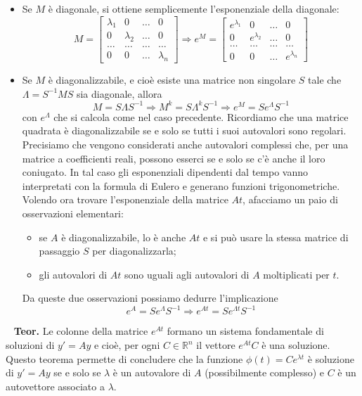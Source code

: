 \begin{itemize}
    \item Se $M$ è diagonale, si ottiene semplicemente l'esponenziale della diagonale:
    \[
        M = \left[\begin{matrix}
            \lambda_1 & 0 & \dots & 0\\
            0 & \lambda_2 & \dots & 0\\
            \dots & \dots & \dots & \dots \\
            0 & 0 & \dots & \lambda_n
        \end{matrix}\right] \Longrightarrow e^{M} = \left[\begin{matrix}
            e^{\lambda_1} & 0 & \dots & 0\\
            0 & e^{\lambda_2} & \dots & 0\\
            \dots & \dots & \dots & \dots \\
            0 & 0 & \dots & e^{\lambda_n}
        \end{matrix}\right]
    \]
    \item Se $M$ è diagonalizzabile, e cioè esiste una matrice non singolare $S$ tale che $\Lambda = S^{-1} M S$ sia diagonale, allora
    \[
        M = S \Lambda S^{-1} \Longrightarrow M^k = S \Lambda^k S^{-1} \Longrightarrow e^{M} = S e^{\Lambda}S^{-1}
    \]
    con $e^{\Lambda}$ che si calcola come nel caso precedente.\newline
    \newline
    Ricordiamo che una matrice quadrata è diagonalizzabile se e solo se tutti i suoi autovalori sono regolari. Precisiamo che vengono considerati anche autovalori complessi che, per una matrice a coefficienti reali, possono esserci se e solo se c'è anche il loro coniugato. In tal caso gli esponenziali dipendenti dal tempo vanno interpretati con la formula di Eulero e generano funzioni trigonometriche.\newline
    \newline
    Volendo ora trovare l'esponenziale della matrice $At$, afacciamo un paio di osservazioni elementari:
    \begin{itemize}
        \item se $A$ è diagonalizzabile, lo è anche $At$ e si può usare la stessa matrice di passaggio $S$ per diagonalizzarla;
        \item gli autovalori di $At$ sono uguali agli autovalori di $A$ moltiplicati per $t$.
    \end{itemize}
    Da queste due osservazioni possiamo dedurre l'implicazione
    \[
        e^{A} = S e^{\Lambda} S^{-1} \Longrightarrow e^{At} = S e^{\Lambda t} S^{-1}
    \]
\end{itemize}
\ \newline
\textbf{Teor.} Le colonne della matrice $e^{At}$ formano un sistema fondamentale di soluzioni di $y' = Ay$ e cioè, per ogni $C \in \mathbb{R}^n$ il vettore $e^{At}C$ è una soluzione.\newline
\newline
Questo teorema permette di concludere che  la funzione $\phi(t) = Ce^{\lambda t}$ è soluzione di $y' = Ay$ se e solo se $\lambda$ è un autovalore di $A$ (possibilmente complesso) e $C$ è un autovettore associato a $\lambda$.
